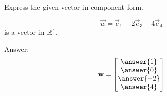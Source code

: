 \documentclass{ximera}
\begin{document}
  \begin{problem}\label{prob:lincombijk2c}
   Express the given vector in component form.
   
  $$\vec{w}=\vec{e}_1-2\vec{e}_3+4\vec{e}_4$$ is a vector in $\mathbb{R}^4$.
  
  Answer:
  $$\vec{w}=\begin{bmatrix}\answer{1}\\\answer{0}\\\answer{-2}\\\answer{4}\end{bmatrix}$$
  \end{problem}

  
\end{document}
